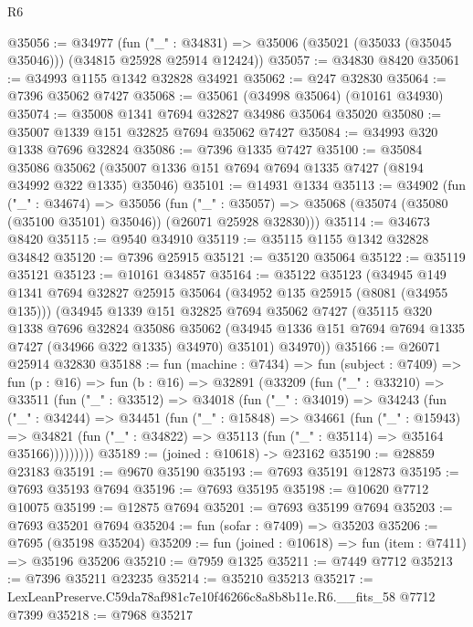 \begin{lexlean}{R6}
\begin{coremodule}
@35056 := @34977
    (fun ("_" : @34831) => @35006 (@35021 (@35033 (@35045 @35046))) (@34815 @25928 @25914 @12424))
@35057 := @34830 @8420
@35061 := @34993 @1155 @1342 @32828 @34921
@35062 := @247 @32830
@35064 := @7396 @35062 @7427
@35068 := @35061 (@34998 @35064) (@10161 @34930)
@35074 := @35008 @1341 @7694 @32827 @34986 @35064 @35020
@35080 := @35007 @1339 @151 @32825 @7694 @35062 @7427
@35084 := @34993 @320 @1338 @7696 @32824
@35086 := @7396 @1335 @7427
@35100 := @35084
    @35086
    @35062
    (@35007 @1336 @151 @7694 @7694 @1335 @7427 (@8194 @34992 @322 @1335) @35046)
@35101 := @14931 @1334
@35113 := @34902
    (fun ("_" : @34674) =>
    @35056
      (fun ("_" : @35057) =>
      @35068 (@35074 (@35080 (@35100 @35101) @35046)) (@26071 @25928 @32830)))
@35114 := @34673 @8420
@35115 := @9540 @34910
@35119 := @35115 @1155 @1342 @32828 @34842
@35120 := @7396 @25915
@35121 := @35120 @35064
@35122 := @35119 @35121
@35123 := @10161 @34857
@35164 := @35122
    @35123
    (@34945
      @149
      @1341
      @7694
      @32827
      @25915
      @35064
      (@34952 @135 @25915 (@8081 (@34955 @135)))
      (@34945
        @1339
        @151
        @32825
        @7694
        @35062
        @7427
        (@35115
          @320
          @1338
          @7696
          @32824
          @35086
          @35062
          (@34945 @1336 @151 @7694 @7694 @1335 @7427 (@34966 @322 @1335) @34970)
          @35101)
        @34970))
@35166 := @26071 @25914 @32830
@35188 := fun (machine : @7434) =>
  fun (subject : @7409) =>
  fun (p : @16) =>
  fun (b : @16) =>
  @32891
    (@33209
      (fun ("_" : @33210) =>
      @33511
        (fun ("_" : @33512) =>
        @34018
          (fun ("_" : @34019) =>
          @34243
            (fun ("_" : @34244) =>
            @34451
              (fun ("_" : @15848) =>
              @34661
                (fun ("_" : @15943) =>
                @34821 (fun ("_" : @34822) => @35113 (fun ("_" : @35114) => @35164 @35166)))))))))
@35189 := (joined : @10618) -> @23162
@35190 := @28859 @23183
@35191 := @9670 @35190
@35193 := @7693 @35191 @12873
@35195 := @7693 @35193 @7694
@35196 := @7693 @35195
@35198 := @10620 @7712 @10075
@35199 := @12875 @7694
@35201 := @7693 @35199 @7694
@35203 := @7693 @35201 @7694
@35204 := fun (sofar : @7409) => @35203
@35206 := @7695 (@35198 @35204)
@35209 := fun (joined : @10618) => fun (item : @7411) => @35196 @35206
@35210 := @7959 @1325
@35211 := @7449 @7712
@35213 := @7396 @35211 @23235
@35214 := @35210 @35213
@35217 := LexLeanPreserve.C59da78af981c7e10f46266c8a8b8b11e.R6.__fits_58 @7712 @7399
@35218 := @7968 @35217

\end{coremodule}
\end{lexlean}
